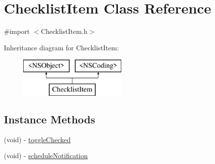 \hypertarget{interface_checklist_item}{\section{Checklist\-Item Class Reference}
\label{interface_checklist_item}
}


{\ttfamily \#import $<$Checklist\-Item.\-h$>$}

Inheritance diagram for Checklist\-Item\-:\begin{figure}[H]
\begin{center}
\leavevmode
\includegraphics[height=2.000000cm]{interface_checklist_item}
\end{center}
\end{figure}
\subsection*{Instance Methods}
\begin{DoxyCompactItemize}
\item 
(void) -\/ \hyperlink{interface_checklist_item_ac458392102cff14f30fd2e920bf328fe}{toggle\-Checked}
\item 
(void) -\/ \hyperlink{interface_checklist_item_a8dfbb66c70cfda089ed7cb12f05aff5f}{schedule\-Notification}
\end{DoxyCompactItemize}
